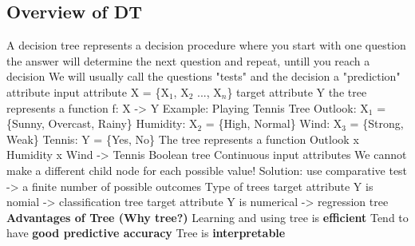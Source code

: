 \subsection{Overview of DT}
\begin{outline}
    \1 A decision tree represents a decision procedure where
        \2 you start with one question
        \2 the answer will determine the next question
        \2 and repeat, untill you reach a decision
    \1 We will usually call the questions "tests" and the decision a "prediction"
    \1 attribute
        \2 input attribute X = \{X$_{1}$, X$_{2}$ ..., X$_{n}$\}
        \2 target attribute Y
        \2 the tree represents a function f: X -> Y
    \1 Example: Playing Tennis Tree
        \2 Outlook: X$_{1}$ = \{Sunny, Overcast, Rainy\}
        \2 Humidity: X$_{2}$ = \{High, Normal\}
        \2 Wind: X$_{3}$ = \{Strong, Weak\}
        \2 Tennis: Y = \{Yes, No\}
        \2 The tree represents a function Outlook x Humidity x Wind -> Tennis
    \1 Boolean tree
    \1 Continuous input attributes
        \2 We cannot make a different child node for each possible value!
        \2 Solution: use comparative test -> a finite number of possible outcomes
    \1 Type of trees
        \2 target attribute Y is nomial -> classification tree
        \2 target attribute Y is numerical -> regression tree
    \1 \textbf{Advantages of Tree (Why tree?)}
        \2 Learning and using tree is \textbf{efficient}
        \2 Tend to have \textbf{good predictive accuracy}
        \2 Tree is \textbf{interpretable}
\end{outline}

